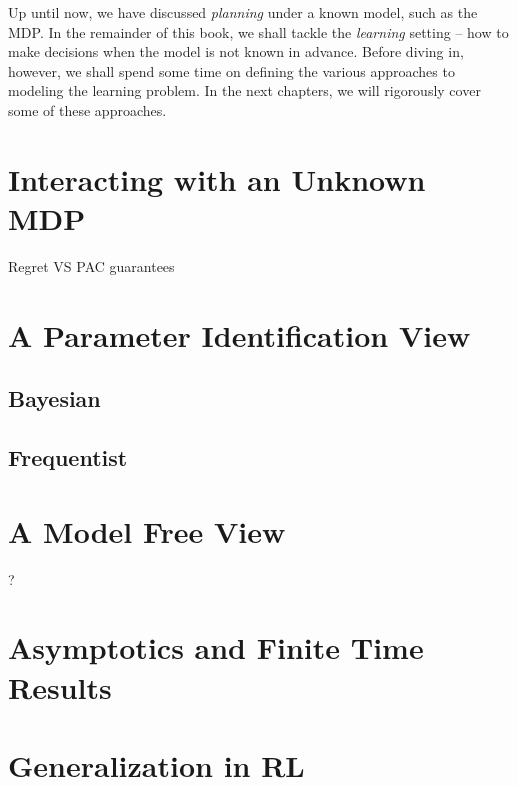 Up until now, we have discussed \textit{planning} under a known model, such as the MDP. In the remainder of this book, we shall tackle the \textit{learning} setting -- how to make decisions when the model is not known in advance. Before diving in, however, we shall spend some time on defining the various approaches to modeling the learning problem. In the next chapters, we will rigorously cover some of these approaches.

\section{Interacting with an Unknown MDP}

Regret VS PAC guarantees

\section{A Parameter Identification View}

\subsection{Bayesian}

\subsection{Frequentist}

\section{A Model Free View}
?

\section{Asymptotics and Finite Time Results}

\section{Generalization in RL}
